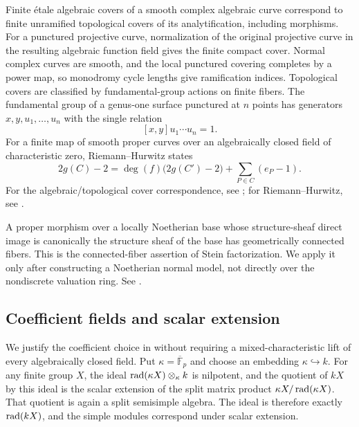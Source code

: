 \begin{foundation}\label{foundation:complex}
Finite \'etale algebraic covers of a smooth complex algebraic curve
correspond to finite unramified topological covers of its analytification,
including morphisms. For a punctured projective curve, normalization of
the original projective curve in the resulting algebraic function field
gives the finite compact cover. Normal complex curves are smooth, and the
local punctured covering completes by a power map, so monodromy cycle
lengths give ramification indices. Topological covers are classified by
fundamental-group actions on finite fibers. The fundamental group of a
genus-one surface punctured at $n$ points has generators
$x,y,u_1,\ldots,u_n$ with the single relation
\[
 [x,y]u_1\cdots u_n=1.
\]
For a finite map of smooth proper curves over an algebraically closed field of characteristic zero, Riemann--Hurwitz states
\[
 2g(C)-2=\deg(f)\bigl(2g(C')-2\bigr)
              +\sum_{P\in C}(e_P-1).
\]
For the algebraic/topological cover correspondence, see \cite[Theorem~3.4]{MilneLEC2008}; for Riemann--Hurwitz, see \cite[Section~53.12, Tag 0C1B]{Stacks}.
\end{foundation}

\begin{foundation}\label{foundation:connectedness}
A proper morphism over a locally Noetherian base whose structure-sheaf direct image is canonically the structure sheaf of the base has geometrically connected fibers. This is the connected-fiber assertion of Stein factorization. We apply it only after constructing a Noetherian normal model, not directly over the nondiscrete valuation ring.
See \cite[Tag 03H0]{Stacks}.
\end{foundation}

\subsection{Coefficient fields and scalar extension}\label{sec:coefficients}

We justify the coefficient choice in  without
requiring a mixed-characteristic lift of every algebraically closed
field. Put $\kappa=\overline{\mathbb F}_p$ and choose an embedding
$\kappa\hookrightarrow k$. For any finite group $X$, the ideal
$\operatorname{rad}(\kappa X)\otimes_\kappa k$ is nilpotent, and the quotient of
$kX$ by this ideal is the scalar extension of the split matrix product
$\kappa X/\operatorname{rad}(\kappa X)$. That quotient is again a split semisimple
algebra. The ideal is therefore exactly $\operatorname{rad}(kX)$, and the simple
modules correspond under scalar extension.

